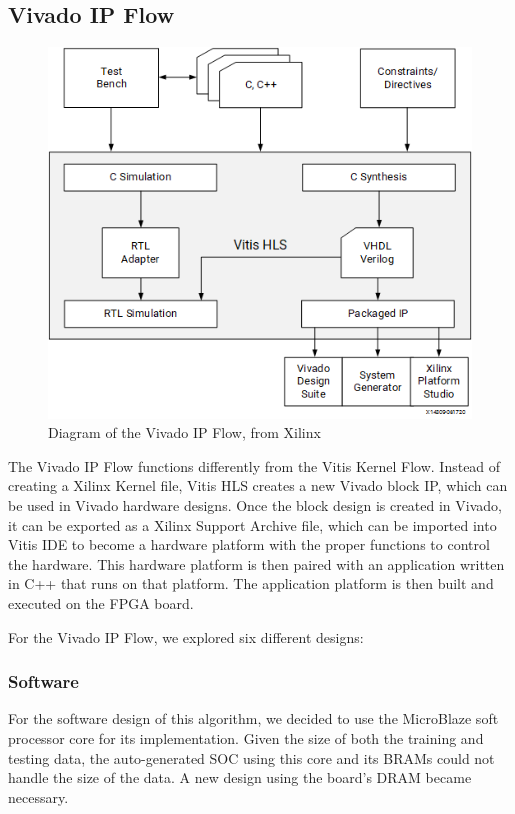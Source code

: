 \documentclass[11pt, final, conference, letterpaper, twocolumn]{IEEEtran}[2015/08/26]
\begin{document}
\subsection{Vivado IP Flow}

\begin{figure}
  \centering
  \includegraphics[width=.75\linewidth]{vivadoipflow.png}
  \caption{Diagram of the Vivado IP Flow, from Xilinx}
  \label{fig:ex:vivadoipflow}
\end{figure}

The Vivado IP Flow functions differently from the Vitis Kernel Flow. Instead of creating a Xilinx Kernel file, Vitis HLS creates a new Vivado block IP, which can be used in Vivado hardware designs. Once the block design is created in Vivado, it can be exported as a Xilinx Support Archive file, which can be imported into Vitis IDE to become a hardware platform with the proper functions to control the hardware. This hardware platform is then paired with an application written in C++ that runs on that platform. The application platform is then built and executed on the FPGA board.

For the Vivado IP Flow, we explored six different designs:

\subsubsection{Software}

For the software design of this algorithm, we decided to use the MicroBlaze soft processor core for its implementation.
Given the size of both the training and testing data, the auto-generated SOC using this core and its BRAMs could not handle the size of the data.
A new design using the board's DRAM became necessary.
\end{document}
